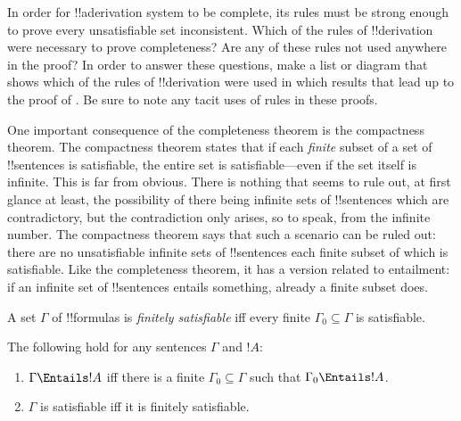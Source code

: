 \begin{prob}
In order for !!a{derivation} system to be complete, its rules must be
strong enough to prove every unsatisfiable set inconsistent.  Which of
the rules of !!{derivation} were necessary to prove completeness?  Are any
of these rules not used anywhere in the proof?  In order to answer
these questions, make a list or diagram that shows which of the rules
of !!{derivation} were used in which results that lead up to the proof of
.  Be sure to note any tacit
uses of rules in these proofs.
\end{prob}










One important consequence of the completeness theorem is the
compactness theorem.  The compactness theorem states that if each
\emph{finite} subset of a set of !!{sentence}s is satisfiable, the
entire set is satisfiable---even if the set itself is infinite. This
is far from obvious. There is nothing that seems to rule out, at first
glance at least, the possibility of there being infinite sets of
!!{sentence}s which are contradictory, but the contradiction only
arises, so to speak, from the infinite number.  The compactness
theorem says that such a scenario can be ruled out: there are no
unsatisfiable infinite sets of !!{sentence}s each finite subset of
which is satisfiable. Like the completeness theorem, it has a version
related to entailment: if an infinite set of !!{sentence}s entails
something, already a finite subset does.

\begin{defn}
  A set $\Gamma$ of !!{formula}s is \emph{finitely satisfiable} iff every finite $\Gamma_0 \subseteq \Gamma$ is satisfiable.
\end{defn}

\begin{thm}
The following hold for any sentences $\Gamma$ and $!A$:
\begin{enumerate}
  \item $\Gamma \Entails !A$ iff there is a finite $\Gamma_0
    \subseteq \Gamma$ such that $\Gamma_0 \Entails !A$.
  \item $\Gamma$ is satisfiable iff it is finitely
    satisfiable.
\end{enumerate}
\end{thm}

